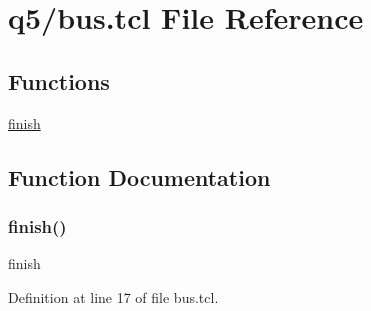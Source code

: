 \hypertarget{bus_8tcl}{}\section{q5/bus.tcl File Reference}
\label{bus_8tcl}
\subsection*{Functions}
\begin{DoxyCompactItemize}
\item 
\hyperlink{bus_8tcl_a30728837c246b65ef76298af0101d99c}{finish}
\end{DoxyCompactItemize}


\subsection{Function Documentation}
\mbox{\label{bus_8tcl_a30728837c246b65ef76298af0101d99c}} 
\subsubsection{\texorpdfstring{finish()}{finish()}}
{\footnotesize\ttfamily finish}



Definition at line 17 of file bus.\+tcl.

